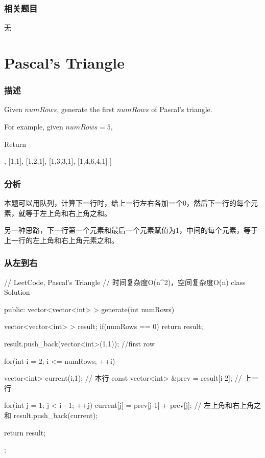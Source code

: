 \subsubsection{相关题目}

\begindot
\item 无
\myenddot


\section{Pascal's Triangle} %
\label{sec:pascal-s-triangle}


\subsubsection{描述}
Given $numRows$, generate the first $numRows$ of Pascal's triangle.

For example, given $numRows = 5$,

Return
\begin{Code}
[
     [1],
    [1,1],
   [1,2,1],
  [1,3,3,1],
 [1,4,6,4,1]
]
\end{Code}


\subsubsection{分析}
本题可以用队列，计算下一行时，给上一行左右各加一个0，然后下一行的每个元素，就等于左上角和右上角之和。

另一种思路，下一行第一个元素和最后一个元素赋值为1，中间的每个元素，等于上一行的左上角和右上角元素之和。


\subsubsection{从左到右}
\begin{Code}
// LeetCode, Pascal's Triangle
// 时间复杂度O(n^2)，空间复杂度O(n)
class Solution {
public:
    vector<vector<int> > generate(int numRows) {
        vector<vector<int> > result;
        if(numRows == 0) return result;

        result.push_back(vector<int>(1,1)); //first row

        for(int i = 2; i <= numRows; ++i) {
            vector<int> current(i,1);  // 本行
            const vector<int> &prev = result[i-2];  // 上一行

            for(int j = 1; j < i - 1; ++j) {
                current[j] = prev[j-1] + prev[j]; // 左上角和右上角之和
            }
            result.push_back(current);
        }
        return result;
    }
};
\end{Code}



